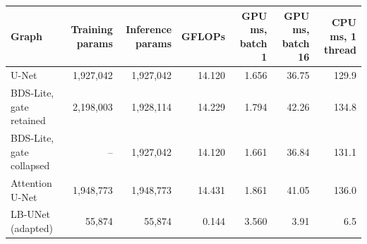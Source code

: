 \begin{tabular}{@{}lrrrrrr@{}}
\toprule
Graph & Training params & Inference params & GFLOPs & GPU ms, batch 1 & GPU ms, batch 16 & CPU ms, 1 thread \\
\midrule
U-Net & 1,927,042 & 1,927,042 & 14.120 & 1.656 & 36.75 & 129.9 \\
BDS-Lite, gate retained & 2,198,003 & 1,928,114 & 14.229 & 1.794 & 42.26 & 134.8 \\
BDS-Lite, gate collapsed & -- & 1,927,042 & 14.120 & 1.661 & 36.84 & 131.1 \\
Attention U-Net & 1,948,773 & 1,948,773 & 14.431 & 1.861 & 41.05 & 136.0 \\
LB-UNet (adapted) & 55,874 & 55,874 & 0.144 & 3.560 & 3.91 & 6.5 \\
\bottomrule
\end{tabular}
